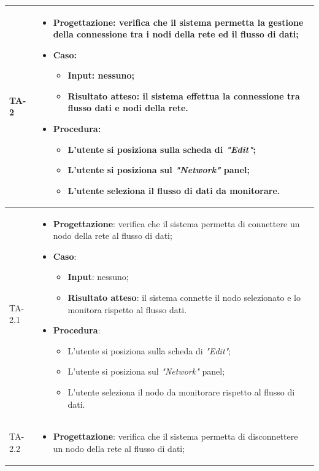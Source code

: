 \begin{longtable}{|C{2.5cm}|C{13cm}|}
{TA-2} &
\begin{itemize}
	\item \textbf{Progettazione}: verifica che il sistema permetta la gestione della connessione tra i nodi della rete ed il flusso di dati;
	\item \textbf{Caso}: 
	\begin{itemize}
		\item \textbf{Input}: nessuno;
		\item \textbf{Risultato atteso}: il sistema effettua la connessione tra flusso dati e nodi della rete.
	\end{itemize}
	\item \textbf{Procedura}:
	\begin{itemize}
		\item L'utente si posiziona sulla scheda di \emph{"Edit"};
		\item L'utente si posiziona sul \emph{"Network"} panel;
		\item L'utente seleziona il flusso di dati da monitorare.
	\end{itemize} 
\end{itemize} \\
 \hline
{TA-2.1} &
\begin{itemize}
	\item \textbf{Progettazione}: verifica che il sistema permetta di connettere un nodo della rete al flusso di dati;
	\item \textbf{Caso}: 
	\begin{itemize}
		\item \textbf{Input}: nessuno;
		\item \textbf{Risultato atteso}: il sistema connette il nodo selezionato e lo monitora rispetto al flusso dati.
	\end{itemize}
	\item \textbf{Procedura}:
	\begin{itemize}
		\item L'utente si posiziona sulla scheda di \emph{"Edit"};
		\item L'utente si posiziona sul \emph{"Network"} panel;
		\item L'utente seleziona il nodo da monitorare rispetto al flusso di dati.
	\end{itemize} 
\end{itemize} \\
\hline
{TA-2.2} &
\begin{itemize}
	\item \textbf{Progettazione}: verifica che il sistema permetta di disconnettere un nodo della rete al flusso di dati;

\end{itemize}
\end{longtable}
